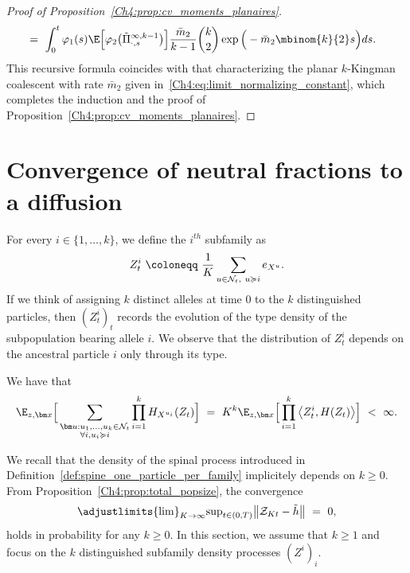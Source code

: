 \begin{refsegment}
\begin{proof}[Proof of Proposition~\ref{Ch4:prop:cv_moments_planaires}]
\begin{align*}
  & =\  \int_{0}^{t}\varphi_1(s)
        \E\Big[\varphi_2\big(\tilde{\Pi}^{\infty,k-1}_{\cdot,s}\big)\Big] \frac{\bar m_2}{k-1}\binom{k}{2}
        \exp\Big(-\bar m_2\mbinom{k}{2}s\Big) d s.
\end{align*}
This recursive formula coincides with that characterizing the planar $k$-Kingman coalescent with rate $\bar{m}_2$ given in~\eqref{Ch4:eq:limit_normalizing_constant}, 
which completes the induction and the proof of Proposition~\ref{Ch4:prop:cv_moments_planaires}.
\end{proof}



\section{Convergence of neutral fractions to a diffusion}
For every $i\in\{1,\ldots,k\}$, we define the $i^{th}$ subfamily as
\[
Z_t^{i}\ \coloneqq\ \frac{1}{K} \sum_{u\in{\cal N}_t,\ u \succcurlyeq i} e_{X^u}.
\]
If we think of assigning $k$ distinct alleles at time $0$ to the $k$ distinguished particles, then $(Z^i_t)_t$ records the evolution of the type density of the subpopulation bearing allele $i$.  We observe that the distribution of $Z^i_t$ depends on the ancestral particle $i$ only through its type.

We have that
\[
\E_{z, \bm x}\Big[\sum_{ \substack{\bm u: u_1, \ldots, u_k \in \mathcal{N}_t\\ \forall i, u_i\succcurlyeq i}} \prod_{i=1}^k H_{X^{u_i}}(Z_t) \Big]\ =\ K^k \E_{z,\bm x}\Big[ \prod_{i=1}^k\big\langle Z^i_t, H(Z_t)\big\rangle \Big] \ <\  \infty.
\]



We recall that the density of the spinal process introduced in Definition~\ref{def:spine_one_particle_per_family} implicitely depends on $k\geq 0$. 
From Proposition~\ref{Ch4:prop:total_popsize}, the convergence
 \[
 \adjustlimits{\lim}_{K\to\infty}{\sup}_{t\in (0,T)} \big\lVert\mathcal Z_{Kt} - \tilde h \big\rVert \ =\ 0,
 \]
holds in probability for any $k\geq 0$.
In this section, we assume that $k\geq 1$ and focus on the $k$ distinguished subfamily density processes $(Z^{i})_i$. 


\end{refsegment}
